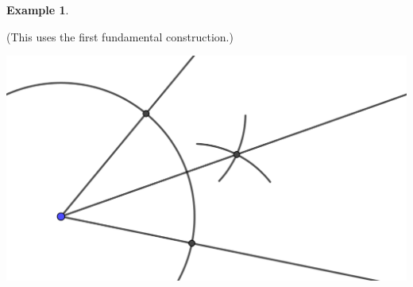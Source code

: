 \documentclass[11pt]{article}
\theoremstyle{definition}
\newtheorem{example}[theorem]{Example}
\begin{document}
\begin{example}
\begin{enumerate}
    (This uses the first fundamental construction.)
  \begin{center}
    \includegraphics[scale=.75]{Images/bisect_angle_4.png}
  \end{center}
  \end{enumerate}
\end{example}
\end{document}
